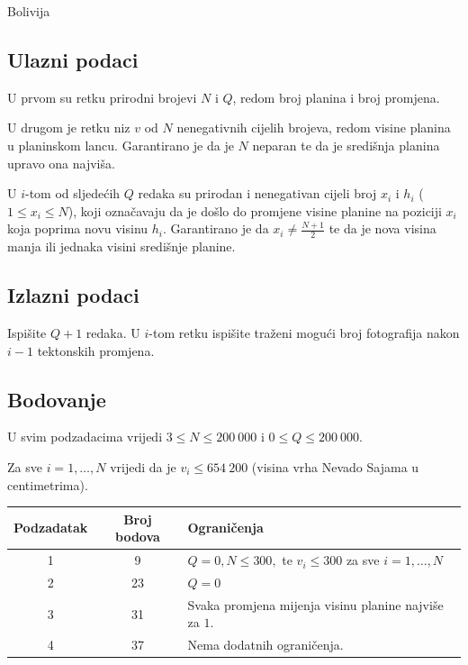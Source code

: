 \begin{statement}[
  problempoints=100,
  timelimit=1 sekunda,
  memorylimit=512 MiB,
]{Bolivija}
\subsection*{Ulazni podaci}

U prvom su retku prirodni brojevi $N$ i $Q$, redom broj planina i broj promjena.

U drugom je retku niz $v$ od $N$ nenegativnih cijelih brojeva, redom visine planina u planinskom lancu. 
Garantirano je da je $N$ neparan te da je središnja planina upravo ona najviša. 

U $i$-tom od sljedećih $Q$ redaka su prirodan i nenegativan cijeli broj $x_i$ i $h_i$ ($1 \leq x_i \leq N$), 
koji označavaju da je došlo do promjene visine planine na poziciji $x_i$ koja poprima 
novu visinu $h_i$. Garantirano je da $x_i \ne \frac{N+1}{2}$ te da je nova visina manja 
ili jednaka visini središnje planine. 

\subsection*{Izlazni podaci}

Ispišite $Q + 1$ redaka. U $i$-tom retku ispišite traženi mogući broj fotografija 
nakon $i - 1$ tektonskih promjena. 

\subsection*{Bodovanje}

U svim podzadacima vrijedi $3 \leq N \leq 200~000$ i $0 \leq Q \leq 200~000$. 

Za sve $i = 1, \dots, N$ vrijedi da je $v_i \leq 654~200$ 
(visina vrha Nevado Sajama u centimetrima). 

{\renewcommand{\arraystretch}{1.4}
  \setlength{\tabcolsep}{6pt}
  \begin{tabular}{ccl}
   Podzadatak & Broj bodova & Ograničenja \\ \midrule
    1 & 9 & $Q = 0, N \leq 300,$ te $v_i \leq 300$ za sve $i = 1, \dots, N$ \\
    2 & 23 & $Q = 0$ \\
    3 & 31 & Svaka promjena mijenja visinu planine najviše za $1$.  \\
    4 & 37 & Nema dodatnih ograničenja. \\
\end{tabular}}


\end{statement}
